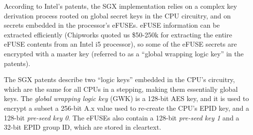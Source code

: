 \label{sec:sgx_hardware_keys}












According to Intel's patents, the SGX implementation relies on a complex key
derivation process rooted on global secret keys in the CPU circuitry, and on
secrets embedded in the processor's eFUSEs. eFUSE information can be extracted
efficiently (Chipworks quoted us \$50-250k for extracting the entire eFUSE
contents from an Intel i5 processor), so some of the eFUSE secrets are
encrypted with a master key (referred to as a ``global wrapping logic key'' in
the patents).

The SGX patents describe two ``logic keys'' embedded in the CPU's circuitry,
which are the same for all CPUs in a stepping, making them essentially global
keys. The \textit{global wrapping logic key} (GWK) is a 128-bit AES key, and it is
used to encrypt a subset a 256-bit A.x value used to re-create the CPU's EPID
key, and a 128-bit \textit{pre-seed key 0}. The eFUSEs also contain a 128-bit
\textit{pre-seed key 1} and a 32-bit EPID group ID, which are stored in
cleartext.


